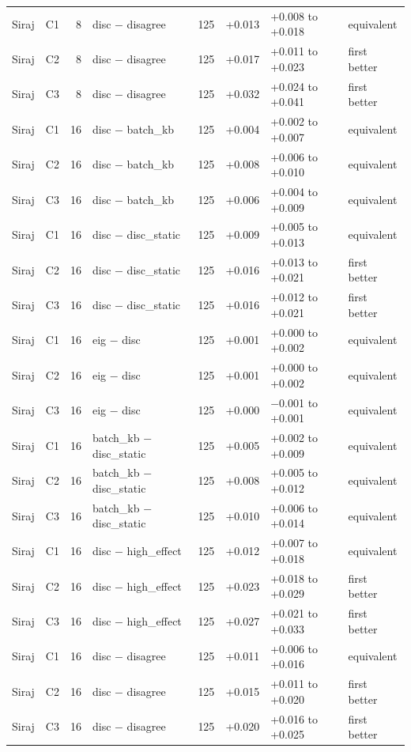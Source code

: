 {\begin{longtable}{llrlrrll}
Siraj & C1 & 8 & disc $-$ disagree & 125 & +0.013 & +0.008 to +0.018 & equivalent  \\
Siraj & C2 & 8 & disc $-$ disagree & 125 & +0.017 & +0.011 to +0.023 & first better \\
Siraj & C3 & 8 & disc $-$ disagree & 125 & +0.032 & +0.024 to +0.041 & first better \\
Siraj & C1 & 16 & disc $-$ batch\_kb & 125 & +0.004 & +0.002 to +0.007 & equivalent  \\
Siraj & C2 & 16 & disc $-$ batch\_kb & 125 & +0.008 & +0.006 to +0.010 & equivalent  \\
Siraj & C3 & 16 & disc $-$ batch\_kb & 125 & +0.006 & +0.004 to +0.009 & equivalent  \\
Siraj & C1 & 16 & disc $-$ disc\_static & 125 & +0.009 & +0.005 to +0.013 & equivalent  \\
Siraj & C2 & 16 & disc $-$ disc\_static & 125 & +0.016 & +0.013 to +0.021 & first better \\
Siraj & C3 & 16 & disc $-$ disc\_static & 125 & +0.016 & +0.012 to +0.021 & first better \\
Siraj & C1 & 16 & eig $-$ disc & 125 & +0.001 & +0.000 to +0.002 & equivalent  \\
Siraj & C2 & 16 & eig $-$ disc & 125 & +0.001 & +0.000 to +0.002 & equivalent  \\
Siraj & C3 & 16 & eig $-$ disc & 125 & +0.000 & $-$0.001 to +0.001 & equivalent  \\
Siraj & C1 & 16 & batch\_kb $-$ disc\_static & 125 & +0.005 & +0.002 to +0.009 & equivalent  \\
Siraj & C2 & 16 & batch\_kb $-$ disc\_static & 125 & +0.008 & +0.005 to +0.012 & equivalent  \\
Siraj & C3 & 16 & batch\_kb $-$ disc\_static & 125 & +0.010 & +0.006 to +0.014 & equivalent  \\
Siraj & C1 & 16 & disc $-$ high\_effect & 125 & +0.012 & +0.007 to +0.018 & equivalent  \\
Siraj & C2 & 16 & disc $-$ high\_effect & 125 & +0.023 & +0.018 to +0.029 & first better \\
Siraj & C3 & 16 & disc $-$ high\_effect & 125 & +0.027 & +0.021 to +0.033 & first better \\
Siraj & C1 & 16 & disc $-$ disagree & 125 & +0.011 & +0.006 to +0.016 & equivalent  \\
Siraj & C2 & 16 & disc $-$ disagree & 125 & +0.015 & +0.011 to +0.020 & first better \\
Siraj & C3 & 16 & disc $-$ disagree & 125 & +0.020 & +0.016 to +0.025 & first better \\

\end{longtable}}

